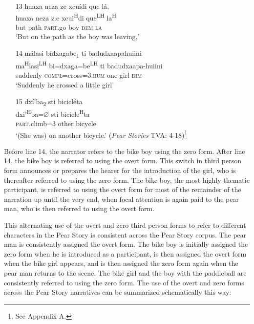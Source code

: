 \begin{itemize}
\item[13]
\glll huaxa neza ze xcu\'{i}di que l\'{a}, \\
huaxa neza z.e xcui\textsuperscript{H}di que\textsuperscript{LH} la\textsuperscript{H} \\
but path \textsc{part}.go boy \textsc{dem} \textsc{la} \\
\glt `But on the path as the boy was leaving,'


\item[14]
\glll m\'{a}lasi b\'{i}dxagabe\textsubscript{1} t\'{i} badudxaapahuiini \\
ma\textsuperscript{H}lasi\textsuperscript{LH} bi=dxaga=be\textsuperscript{LH}  ti badudxaapa-huiini \\
suddenly \textsc{compl}=cross=\textsc{3.hum} one girl-\textsc{dim} \\
\glt `Suddenly he crossed a little girl'


\item[15]
\glll dx\'{i}'ba\textsubscript{2} sti bicicl\'{e}ta \\
dxi'\textsuperscript{H}ba={$\varnothing$} sti bicicle\textsuperscript{H}ta \\
\textsc{part}.climb=\textsc{3} other bicycle \\
\glt `(She was) on another bicycle.' \hfill{(\textit{Pear Stories} TVA: 4-18)\footnote{See Appendix A.}}

\end{itemize}
\z

Before line 14, the narrator refers to the bike boy using the zero form. After line 14, the bike boy is referred to using the overt form. This switch in third person form announces or prepares the hearer for the introduction of the girl, who is thereafter referred to using the zero form. The bike boy, the most highly thematic participant, is referred to using the overt form for most of the remainder of the narration up until the very end, when focal attention is again paid to the pear man, who is then referred to using the overt form.

This alternating use of the overt and zero third person forms to refer to different characters in the Pear Story is consistent across the Pear Story corpus. The pear man is consistently assigned the overt form. The bike boy is initially assigned the zero form when he is introduced as a participant, is then assigned the overt form when the bike girl appears, and is then assigned the zero form again when the pear man returns to the scene. The bike girl and the boy with the paddleball are consistently referred to using the zero form. The use of the overt and zero forms across the Pear Story narratives can be summarized schematically this way:

